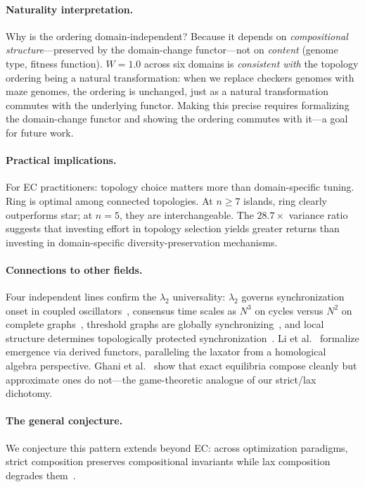 \documentclass[submission,copyright,creativecommons]{eptcs}
\begin{document}
\paragraph{Naturality interpretation.}
Why is the ordering domain-independent? Because it depends on
\emph{compositional structure}---preserved by the domain-change
functor---not on \emph{content} (genome type, fitness function).
$W = 1.0$ across six domains is \emph{consistent with} the topology
ordering being a natural transformation: when we replace checkers
genomes with maze genomes, the ordering is unchanged, just as a
natural transformation commutes with the underlying functor.
Making this precise requires formalizing the domain-change functor
and showing the ordering commutes with it---a goal for future work.

\paragraph{Practical implications.}
For EC practitioners: topology choice matters more than
domain-specific tuning. Ring is optimal among connected topologies.
At $n \geq 7$ islands, ring clearly outperforms star; at $n{=}5$,
they are interchangeable. The $28.7\times$ variance ratio suggests
that investing effort in topology selection yields greater returns
than investing in domain-specific diversity-preservation mechanisms.

\paragraph{Connections to other fields.}
Four independent lines confirm the $\lambda_2$ universality:
$\lambda_2$ governs synchronization onset in coupled
oscillators~\cite{sanz2026algebraic}, consensus time scales as
$N^3$ on cycles versus $N^2$ on complete
graphs~\cite{brewster2025diversity}, threshold graphs are globally
synchronizing~\cite{wu2025threshold}, and local structure determines
topologically protected
synchronization~\cite{ostilli2025topological}. Li et
al.~\cite{li2023emergence} formalize emergence via derived functors,
paralleling the laxator from a homological algebra perspective.
Ghani et al.~\cite{ghani2025approximate} show that exact equilibria
compose cleanly but approximate ones do not---the game-theoretic
analogue of our strict/lax dichotomy.

\paragraph{The general conjecture.}
We conjecture this pattern extends beyond EC: across optimization
paradigms, strict composition preserves compositional invariants while
lax composition degrades
them~\cite{chen2025scaling,kumar2026constitutional,
alphaevolve2026marl,alpay2025semantic,assumpcao2025codeevolve,
sanz2026algebraic,han2026conformity}.
\end{document}
